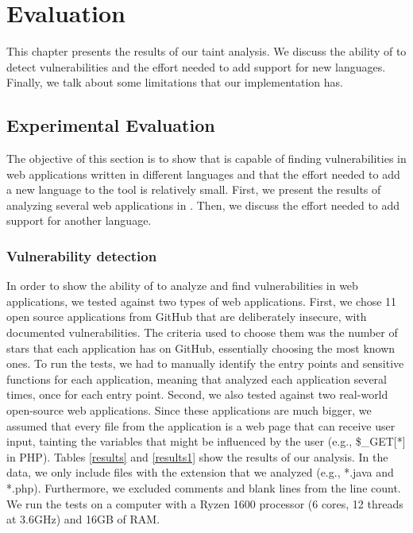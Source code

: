 
\chapter{Evaluation}
\label{chapter:results}

This chapter presents the results of our taint analysis. We discuss the ability of \toolname{} to detect vulnerabilities and the effort needed to add support for new languages. Finally, we talk about some limitations that our implementation has.

\section{Experimental Evaluation}
\label{evaluation}
The objective of this section is to show that \toolname{} is capable of finding vulnerabilities in web applications written in different languages and that the effort needed to add a new language to the tool is relatively small. First, we present the results of analyzing several web applications in \implangs{}. Then, we discuss the effort needed to add support for another language.


\subsection{Vulnerability detection}
In order to show the ability of \toolname{} to analyze and find vulnerabilities in web applications, we tested \toolname{} against two types of web applications. First, we chose 11 open source applications from GitHub that are deliberately insecure, with documented vulnerabilities. The criteria used to choose them was the number of stars that each application has on GitHub, essentially choosing the most known ones. To run the tests, we had to manually identify the entry points and sensitive functions for each application, meaning that \toolname{} analyzed each application several times, once for each entry point. Second, we also tested \toolname{} against two real-world open-source web applications. Since these applications are much bigger, we assumed that every file from the application is a web page that can receive user input, tainting the variables that might be influenced by the user (e.g., \$\_GET[*] in PHP). Tables \ref{results} and \ref{results1} show the results of our analysis. In the data, we only include files with the extension that we analyzed (e.g., *.java and *.php). Furthermore, we excluded comments and blank lines from the line count. We run the tests on a computer with a Ryzen 1600 processor (6 cores, 12 threads at 3.6GHz) and 16GB of RAM. 

